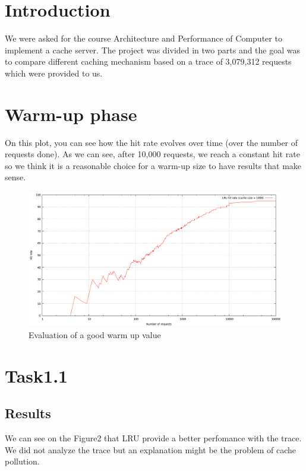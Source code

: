 \section{Introduction}
We were asked for the course Architecture and Performance of Computer to
implement a cache server. The project was divided in two parts and the 
goal was to compare different caching mechanism based on a trace
of 3,079,312 requests which were provided to us.

\section{Warm-up phase}

On this plot, you can see how the hit rate evolves over time (over the
number of requests done). As we can
see, after 10,000 requests, we reach a constant hit rate so we think it is
a reasonable choice for a warm-up size to have results that make sense. 

\begin{figure}[!ht]
	\centering
	\includegraphics[width=\linewidth]{lru_hit_rate.png}
	\caption{Evaluation of a good warm up value}
\end{figure}
\FloatBarrier

\section{Task1.1}

\subsection{Results}
We can see on the Figure2 that LRU provide a better perfomance with the 
trace. We did not analyze the trace but an explanation might be the
problem of cache pollution.

